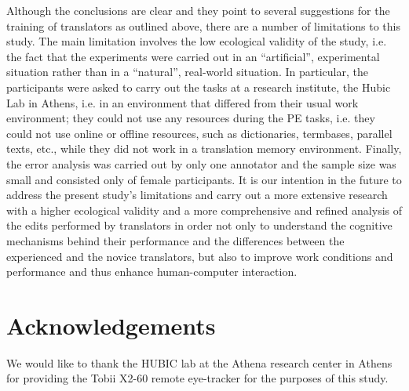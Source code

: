 \documentclass[output=paper]{langscibook}
\begin{document}
Although the conclusions are clear and they point to several suggestions for the training of translators as outlined above, there are a number of limitations to this study. The main limitation involves the low ecological validity of the study, i.e. the fact that the experiments were carried out in an ``artificial'', experimental situation rather than in a ``natural'', real-world situation. In particular, the participants were asked to carry out the tasks at a research institute, the Hubic Lab in Athens, i.e. in an environment that differed from their usual work environment; they could not use any resources during the PE tasks, i.e. they could not use online or offline resources, such as dictionaries, termbases, parallel texts, etc., while they did not work in a translation memory environment. Finally, the error analysis was carried out by only one annotator and the sample size was small and consisted only of female participants. It is our intention in the future to address the present study’s limitations and carry out a more extensive research with a higher ecological validity and a more comprehensive and refined analysis of the edits performed by translators in order not only to understand the cognitive mechanisms behind their performance and the differences between the experienced and the novice translators, but also to improve work conditions and performance and thus enhance human-computer interaction. 

\section*{Acknowledgements}
We would like to thank the HUBIC lab at the Athena research center in Athens for providing the Tobii X2-60 remote eye-tracker for the purposes of this study.
{\sloppy\printbibliography[heading=subbibliography,notkeyword=this]}
\end{document}
